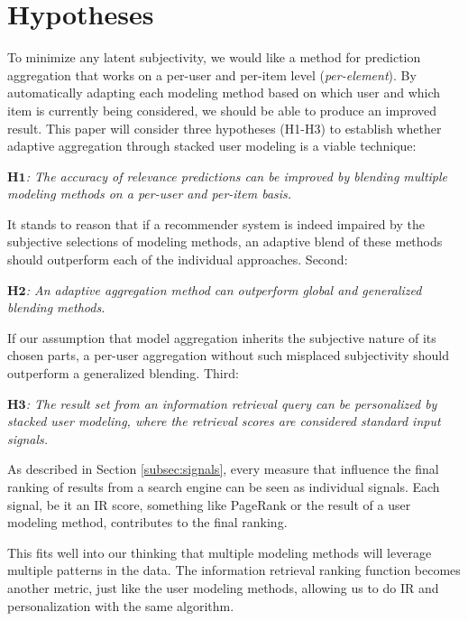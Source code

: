 \section{Hypotheses}
\label{sec:hypotheses}

To minimize any latent subjectivity, we would like a method
for prediction aggregation that works on a per-user and per-item level (\emph{per-element}).
By automatically adapting each modeling method based on which user and which item is currently being
considered, we should be able to produce an improved result.
This paper will consider three hypotheses (H1-H3) 
to establish whether adaptive aggregation through stacked user modeling is a viable technique:

{
  \itshape
  $\mathbf{H1}$: The accuracy of relevance predictions can be improved
  by blending multiple modeling methods on a per-user and per-item basis.
}

It stands to reason that if a recommender system is indeed impaired
by the subjective selections of modeling methods,
an adaptive blend of these methods should outperform each of the individual approaches.
Second:

{
  \itshape
  $\mathbf{H2}$: An adaptive aggregation method can outperform global and generalized 
  blending methods.
}

If our assumption that model aggregation inherits the subjective nature of its chosen parts,
a per-user aggregation without such misplaced subjectivity should outperform a
generalized blending.
Third:

{
  \itshape
  $\mathbf{H3}$: The result set from an information retrieval query
  can be personalized by stacked user modeling, where the retrieval scores are considered 
  standard input signals.
}

As described in Section \ref{subsec:signals},
every measure that influence the final ranking of results from a search engine
can be seen as individual signals. Each signal, be it an IR score,
something like PageRank or the result of a user modeling method,
contributes to the final ranking.

This fits well into our thinking that multiple modeling methods
will leverage multiple patterns in the data.
The information retrieval ranking function
becomes another metric, just like the user modeling methods,
allowing us to do IR and personalization with the same algorithm.

\clearpage

